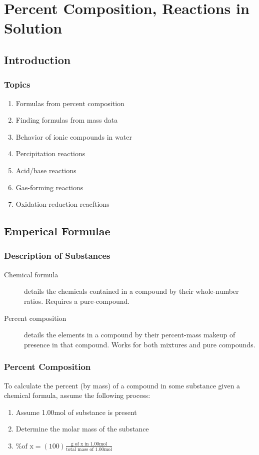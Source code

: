 \chapter{Percent Composition, Reactions in Solution}

\section{Introduction}
\subsection{Topics}
\begin{enumerate}
  \item Formulas from percent composition
  \item Finding formulas from mass data
  \item Behavior of ionic compounds in water
  \item Percipitation reactions
  \item Acid/base reactions
  \item Gas-forming reactions
  \item Oxidation-reduction reacftions
\end{enumerate}

\section{Emperical Formulae}
\subsection{Description of Substances}
\begin{description}
  \item[Chemical formula] details the chemicals contained in a compound by their
    whole-number ratios. Requires a pure-compound.
  \item[Percent composition] details the elements in a compound by their
    percent-mass makeup of presence in that compound. Works for both mixtures
    and pure compounds.
\end{description}

\subsection{Percent Composition}
To calculate the percent (by mass) of a compound in some substance given a
chemical formula, assume the following process:

\begin{enumerate}
\item Assume 1.00mol of substance is present
\item Determine the molar mass of the substance
\item $\text{\% of x}=(100)\frac{\text{g of x in 1.00mol}}{\text{total mass of 1.00mol}}$
\end{enumerate}

